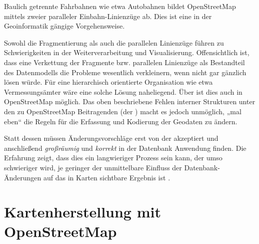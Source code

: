 \documentclass[../main/thesis.tex]{subfiles}
\begin{document}

Baulich getrennte Fahrbahnen wie etwa Autobahnen bildet OpenStreetMap mittels zweier paralleler Einbahn-Linienzüge ab. 
Dies ist eine in der Geoinformatik gängige Vorgehensweise. 

Sowohl die Fragmentierung als auch die parallelen Linienzüge führen zu Schwierigkeiten in der Weiterverarbeitung und Visualisierung. \noref[Mig12 u. a.]
Offensichtlich ist, dass eine Verkettung der Fragmente bzw. parallelen Linienzüge als Bestandteil des Datenmodells die Probleme wesentlich verkleinern, wenn nicht gar gänzlich lösen würde.
Für eine hierarchisch orientierte Organisation wie etwa Vermessungsämter wäre eine solche Lösung naheliegend.
Über  ist dies auch in OpenStreetMap möglich. 
Das oben beschriebene Fehlen interner Strukturen unter den zu OpenStreetMap Beitragenden (der ) macht es jedoch unmöglich, „mal eben“ die Regeln für die Erfassung und Kodierung der Geodaten zu ändern. 


Statt dessen müssen Änderungsvorschläge erst von der  akzeptiert und anschließend \emph{großräumig} und \emph{korrekt} in der Datenbank Anwendung finden.
Die Erfahrung zeigt, dass dies ein langwieriger Prozess sein kann, der umso schwieriger wird, je geringer der unmittelbare Einfluss der Datenbank-Änderungen auf das in Karten sichtbare Ergebnis ist \noref.






\section{Kartenherstellung mit OpenStreetMap} \label{kartenherstellung}
\end{document}
